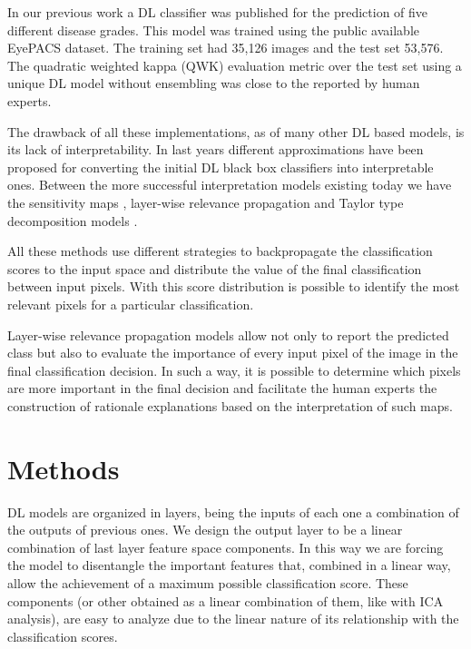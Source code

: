 \documentclass[review]{elsarticle}
\theoremstyle{definition} %
\theoremstyle{remark}
\begin{document}
In our previous work \cite{DELATORRE2017} a DL classifier was published for the prediction of five different disease grades. This model was trained using the public available EyePACS dataset. The training set had 35,126 images and the test set 53,576. The quadratic weighted kappa (QWK) evaluation metric \cite{cohen1968weighted} over the test set using a unique DL model without ensembling was close to the reported by human experts. 

The drawback of all these implementations, as of many other DL based models, is its lack of interpretability. In last years different approximations have been proposed for converting the initial DL black box classifiers into interpretable ones. Between the more successful interpretation models existing today we have the sensitivity maps \cite{DBLP:journals/corr/SimonyanVZ13}, layer-wise relevance propagation \cite{bach2015pixel} and Taylor type decomposition models \cite{montavon2017explaining}. %

All these methods use different strategies to backpropagate the classification scores to the input space and distribute the value of the final classification between input pixels. With this score distribution is possible to identify the most relevant pixels for a particular classification. 

Layer-wise relevance propagation models allow not only to report the predicted class but also to evaluate the importance of every input pixel of the image in the final classification decision. In such a way, it is possible to determine which pixels are more important in the final decision and facilitate the human experts the construction of rationale explanations based on the interpretation of such maps. 

\section{Methods}\label{sec:methods}

DL models are organized in layers, being the inputs of each one a combination of the outputs of previous ones. We design the output layer to be a linear combination of last layer feature space components. In this way we are forcing the model to disentangle the important features that, combined in a linear way, allow the achievement of a maximum possible classification score. These components (or other obtained as a linear combination of them, like with ICA analysis), are easy to analyze due to the linear nature of its relationship with the classification scores.
\end{document}
